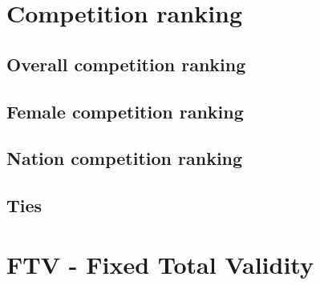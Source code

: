 \documentclass{article}
\begin{document}
\newpage
\section{Competition ranking}
\subsection{Overall competition ranking}
\subsection{Female competition ranking}
\subsection{Nation competition ranking}
\subsection{Ties}

\newpage
\section{FTV - Fixed Total Validity}
\end{document}
